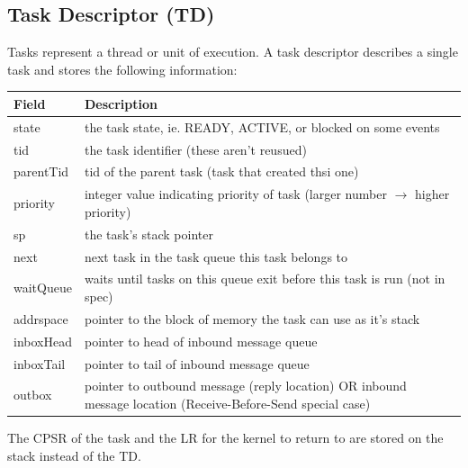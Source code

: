 \documentclass[12pt]{article}
\begin{document}
\subsection{Task Descriptor (TD)}
Tasks represent a thread or unit of execution.  A task descriptor describes a single task and stores the following information:
\begin{center}
  \begin{tabular}{|l|p{}|}
    \hline
    {\bf Field} & {\bf Description} \\\hline
    state & the task state, ie. READY, ACTIVE, or blocked on some events \\\hline
    tid & the task identifier (these aren't reusued) \\\hline
    parentTid & tid of the parent task (task that created thsi one) \\\hline
    priority & integer value indicating priority of task (larger number $\rightarrow$ higher priority) \\\hline
    sp & the task's stack pointer \\\hline
    next & next task in the task queue this task belongs to \\\hline
    waitQueue & waits until tasks on this queue exit before this task is run (not in spec) \\\hline
    addrspace & pointer to the block of memory the task can use as it's stack \\\hline
    inboxHead & pointer to head of inbound message queue \\\hline
    inboxTail & pointer to tail of inbound message queue \\\hline
    outbox & pointer to outbound message (reply location) OR inbound message location (Receive-Before-Send special case) \\\hline
  \end{tabular}
\end{center}
The CPSR of the task and the LR for the kernel to return to are stored on the stack instead of the TD.
\end{document}
